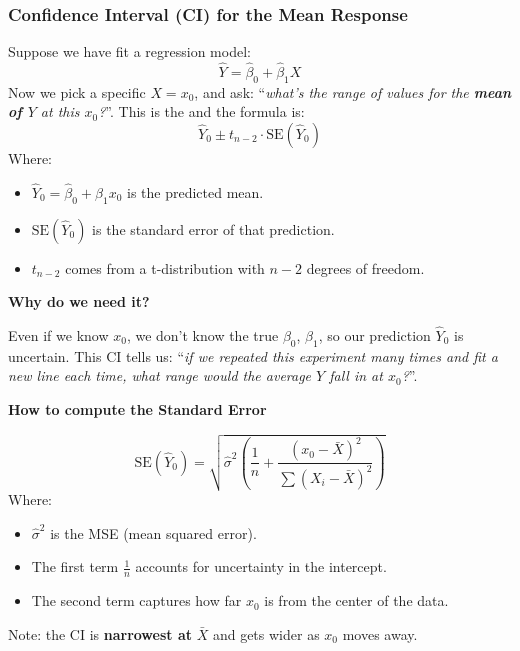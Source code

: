\newpage

\subsubsection{Confidence Interval (CI) for the Mean Response} \label{subsubsection: Confidence Interval for the Mean Response}

Suppose we have fit a regression model:
\begin{equation*}
    \hat{Y} = \hat{\beta}_0 + \hat{\beta}_1 X    
\end{equation*}
Now we pick a specific $X = x_0$, and ask: ``\emph{what's the range of values for the \textbf{mean of $Y$} at this $x_0$?}''. This is the  and the formula is:
\begin{equation}
    \hat{Y}_0 \pm t_{n-2} \cdot \text{SE}\left(\hat{Y}_0\right)
\end{equation}
Where:
\begin{itemize}
    \item $\hat{Y}_0 = \hat{\beta}_0 + \hat{\beta}_1 x_0$ is the predicted mean.
    \item $\text{SE}\left(\hat{Y}_0\right)$ is the standard error of that prediction.
    \item $t_{n-2}$ comes from a t-distribution with $n-2$ degrees of freedom.
\end{itemize}

\highspace
\begin{flushleft}
    \textcolor{Green3}{ \textbf{Why do we need it?}}
\end{flushleft}
Even if we know $x_0$, we don't know the true $\beta_0$, $\beta_1$, so our prediction $\hat{Y}_0$ is uncertain. This CI tells us: ``\emph{if we repeated this experiment many times and fit a new line each time, what range would the average $Y$ fall in at $x_0$?}''.

\highspace
\begin{flushleft}
    \textcolor{Green3}{ \textbf{How to compute the Standard Error}}
\end{flushleft}
\begin{equation}
    \text{SE}\left(\hat{Y}_0\right) = \sqrt{ \hat{\sigma}^2 \left( \dfrac{1}{n} + \dfrac{(x_0 - \bar{X})^2}{\displaystyle\sum \left(X_i - \bar{X}\right)^{2}} \right) }
\end{equation}
Where:
\begin{itemize}
    \item $\hat{\sigma}^2$ is the MSE (mean squared error).
    \item The first term $\frac{1}{n}$ accounts for uncertainty in the intercept.
    \item The second term captures how far $x_0$ is from the center of the data.
\end{itemize}
Note: the CI is \textbf{narrowest at} $\bar{X}$ and gets wider as $x_0$ moves away.

